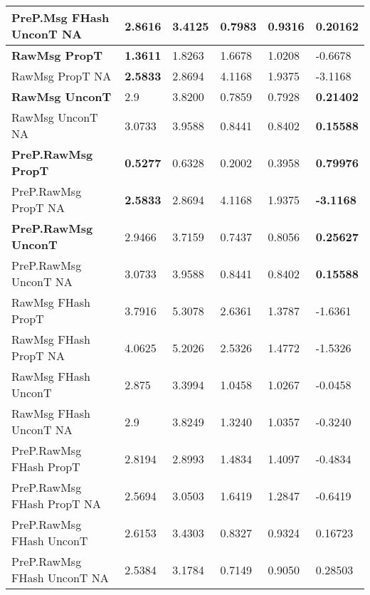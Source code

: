\begin{table}[htb]
\begin{tabularx}{\textwidth}{|Y|L{0.091\textwidth}|L{0.096\textwidth}|L{0.077\textwidth}|L{0.077\textwidth}|L{0.105\textwidth}|}
        PreP.Msg FHash UnconT NA      		& 2.8616				& 3.4125					& 0.7983					& 0.9316					& 0.20162 		\\
        \hline
        \textbf{RawMsg PropT}       		& \textbf{1.3611}		& 1.8263					& 1.6678					& 1.0208					& -0.6678		\\
        RawMsg PropT NA           			& \textbf{2.5833}		& 2.8694					& 4.1168					& 1.9375					& -3.1168		\\
        \hline
        \textbf{RawMsg UnconT }        		& 2.9   				& 3.8200					& 0.7859					& 0.7928					& \textbf{0.21402}		\\
        RawMsg UnconT NA              		& 3.0733				& 3.9588					& 0.8441					& 0.8402					& \textbf{0.15588}		\\
        \hline
        \textbf{PreP.RawMsg PropT }  		& \textbf{0.5277}		& 0.6328					& 0.2002					& 0.3958					& \textbf{0.79976}		\\
        PreP.RawMsg PropT NA        		& \textbf{2.5833}		& 2.8694					& 4.1168					& 1.9375					& \textbf{-3.1168}		\\
        \hline
        \textbf{PreP.RawMsg UnconT}    		& 2.9466				& 3.7159					& 0.7437					& 0.8056					& \textbf{0.25627}		\\
        PreP.RawMsg UnconT NA             	& 3.0733				& 3.9588					& 0.8441					& 0.8402					& \textbf{0.15588}		\\
        \hline
        RawMsg FHash PropT					& 3.7916				& 5.3078					& 2.6361					& 1.3787					& -1.6361		\\
        RawMsg FHash PropT NA        		& 4.0625				& 5.2026					& 2.5326					& 1.4772					& -1.5326		\\
        \hline
        RawMsg FHash UnconT    				& 2.875 				& 3.3994					& 1.0458					& 1.0267					& -0.0458		\\
        RawMsg FHash UnconT NA         		& 2.9   				& 3.8249					& 1.3240					& 1.0357					& -0.3240		\\
        \hline
        PreP.RawMsg FHash PropT				& 2.8194				& 2.8993					& 1.4834					& 1.4097					& -0.4834		\\
        PreP.RawMsg FHash PropT NA    		& 2.5694				& 3.0503					& 1.6419					& 1.2847					& -0.6419		\\
        \hline
        PreP.RawMsg FHash UnconT			& 2.6153				& 3.4303					& 0.8327					& 0.9324					& 0.16723		\\
        PreP.RawMsg FHash UnconT NA	    	& 2.5384				& 3.1784					& 0.7149					& 0.9050					& 0.28503		\\

\end{tabularx}
\end{table}
